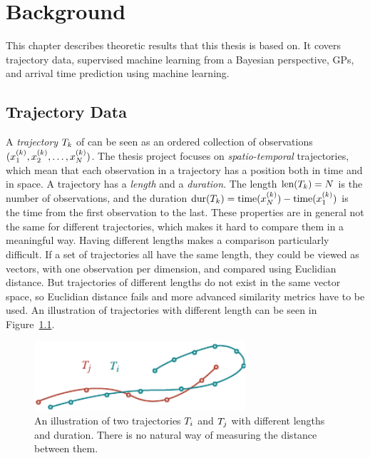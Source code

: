 \chapter{Background}
This chapter describes theoretic results that this thesis is based
on. It covers trajectory data, supervised machine learning from a
Bayesian perspective, GPs, and arrival time prediction using machine learning.

\section{Trajectory Data}
A \textit{trajectory} $T_{k}$ of can be seen as an ordered collection of
observations $(x^{(k)}_1, x^{(k)}_2, \dots, x^{(k)}_N)$.
The thesis project focuses on \textit{spatio-temporal}
trajectories, which mean that each observation in a trajectory has a position both in time
and in space. A trajectory has a \textit{length} and
a \textit{duration}. The length $\text{len}(T_{k}) = N$ is the number of
observations, and the duration $\text{dur}(T_{k}) = \text{time}(x^{(k)}_N) - \text{time}(x^{(k)}_1)$
is the time from the first observation to the last.
These properties are in general not the same for different
trajectories, which makes it hard to compare them in a
meaningful way. Having different lengths makes a comparison
particularly difficult. If a set of trajectories all have the same length, they could
be viewed as vectors, with one observation per dimension, and compared
using Euclidian distance. But trajectories of different lengths do not
exist in the same vector space, so Euclidian distance fails and more
advanced similarity metrics have to be used.
An illustration of trajectories with different length can be seen in Figure~\ref{fig:trajectory-projection-problems}.
\begin{figure}
  \centering
  \includegraphics[width=0.7\textwidth]{figures/trajectory-projection-problems}
  \caption{An illustration of two trajectories $T_{i}$ and $T_{j}$
    with different lengths and duration. There is no natural way of
    measuring the distance between them.}\label{fig:trajectory-projection-problems}
\end{figure}

